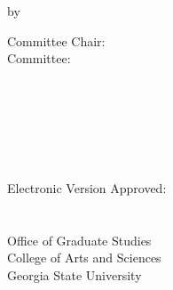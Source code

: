 \begin{center}
\parbox[]{\textwidth}{\centering \titlediss}
\end{center}

\vspace*{0.5in}
\centerline{by}
\vspace*{0.5in}
\centerline{\writerUpper}
\vspace*{1in}

\hspace{0.33\textwidth}
\begin{minipage}[t]{0.33\textwidth}
Committee Chair:\\
Committee: \\
\end{minipage}%
\begin{minipage}[t]{0.33\textwidth}
\begin{flushright}
\chair \\
\committeeOne \\
\committeeTwo \\
\committeeThree \\
\committeeFour \\
\end{flushright}
\end{minipage}%
\vspace{1cm}

\parbox[b]{\textwidth}{
Electronic Version Approved:\\\\\\
Office of Graduate Studies\\
College of Arts and Sciences\\
Georgia State University\\
\gradMonth\ \gradYear
}